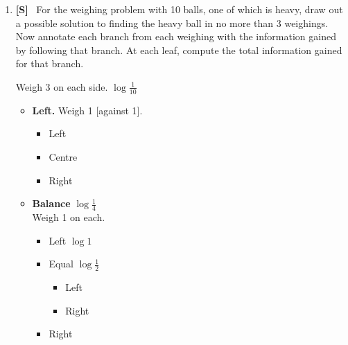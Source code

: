 \documentclass[10pt,\jkfside,a4paper]{article}
\newcommand{\answer}[1]{
    \begin{tcolorbox}[colframe=black, colback=white, sharp corners, boxrule=0.2mm, breakable]
        #1
    \end{tcolorbox}
}
\newcommand{\qtype}[1]{\textbf{[#1]}~}
\begin{document}
\begin{enumerate}
\begin{enumerate}
{            Substituting into $2x^2 + z^2 = 12$:

            \begin{align*}
                z^2 + 4\lambda_2 z - 12 &= 0 \\
                z^2 + 2z^2 - 12 &= 0 \\
                3z^2 &= 12 \\
                z^2 = 4 &\implies z = \pm 2 \implies \lambda_2 = \pm 1 \\
                x^2 = 4 &\implies x = y = \pm 2
            \end{align*}
        }
    \end{enumerate}

    \item
    \qtype{S}
    For the weighing problem with 10 balls, one of which is heavy, draw out a possible solution to finding the heavy ball in no more than 3 weighings. Now annotate each branch from each weighing with the information gained by following that branch. At each leaf, compute the total information gained for that branch.

    \answer{
        Weigh 3 on each side. \hfill $\log \frac{1}{10}$

        \begin{itemize}
            \item \textbf{Left.} Weigh 1 [against 1].
            \begin{itemize}
                \item Left
                \item Centre
                \item Right
            \end{itemize}

            \item \textbf{Balance} \hfill $\log \frac{1}{4}$ \\
            Weigh 1 on each.
            \begin{itemize}
                \item Left \hfill $\log 1$
                \item Equal \hfill $\log \frac{1}{2}$
                \begin{itemize}
                    \item Left
                    \item Right
                \end{itemize}
                \item Right
            \end{itemize}


\end{itemize}}
\end{enumerate}
\end{document}
